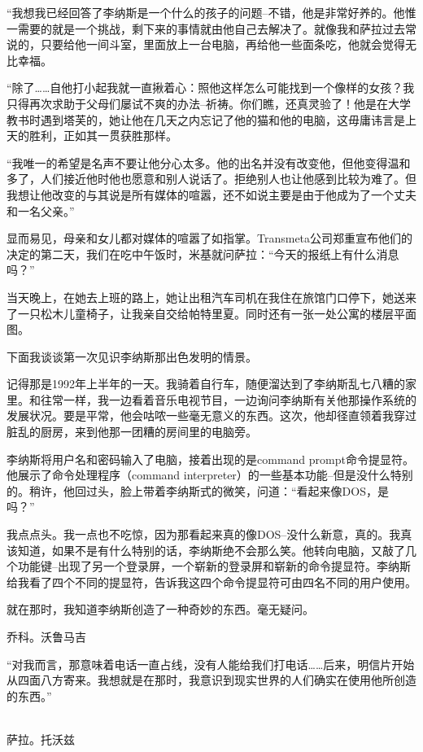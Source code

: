 “我想我已经回答了李纳斯是一个什么的孩子的问题--不错，他是非常好养的。他惟一需要的就是一个挑战，剩下来的事情就由他自己去解决了。就像我和萨拉过去常说的，只要给他一间斗室，里面放上一台电脑，再给他一些面条吃，他就会觉得无比幸福。

“除了……自他打小起我就一直揪着心：照他这样怎么可能找到一个像样的女孩？我只得再次求助于父母们屡试不爽的办法--祈祷。你们瞧，还真灵验了！他是在大学教书时遇到塔芙的，她让他在几天之内忘记了他的猫和他的电脑，这毋庸讳言是上天的胜利，正如其一贯获胜那样。

“我唯一的希望是名声不要让他分心太多。他的出名并没有改变他，但他变得温和多了，人们接近他时他也愿意和别人说话了。拒绝别人也让他感到比较为难了。但我想让他改变的与其说是所有媒体的喧嚣，还不如说主要是由于他成为了一个丈夫和一名父亲。”

显而易见，母亲和女儿都对媒体的喧嚣了如指掌。Transmeta公司郑重宣布他们的决定的第二天，我们在吃中午饭时，米基就问萨拉：“今天的报纸上有什么消息吗？”

当天晚上，在她去上班的路上，她让出租汽车司机在我住在旅馆门口停下，她送来了一只松木儿童椅子，让我亲自交给帕特里夏。同时还有一张一处公寓的楼层平面图。

 

下面我谈谈第一次见识李纳斯那出色发明的情景。

记得那是1992年上半年的一天。我骑着自行车，随便溜达到了李纳斯乱七八糟的家里。和往常一样，我一边看着音乐电视节目，一边询问李纳斯有关他那操作系统的发展状况。要是平常，他会咕哝一些毫无意义的东西。这次，他却径直领着我穿过脏乱的厨房，来到他那一团糟的房间里的电脑旁。

李纳斯将用户名和密码输入了电脑，接着出现的是command prompt命令提显符。他展示了命令处理程序（command interpreter）的一些基本功能--但是没什么特别的。稍许，他回过头，脸上带着李纳斯式的微笑，问道：“看起来像DOS，是吗？”

我点点头。我一点也不吃惊，因为那看起来真的像DOS--没什么新意，真的。我真该知道，如果不是有什么特别的话，李纳斯绝不会那么笑。他转向电脑，又敲了几个功能键--出现了另一个登录屏，一个崭新的登录屏和崭新的命令提显符。李纳斯给我看了四个不同的提显符，告诉我这四个命令提显符可由四名不同的用户使用。

就在那时，我知道李纳斯创造了一种奇妙的东西。毫无疑问。

乔科。沃鲁马吉

 

“对我而言，那意味着电话一直占线，没有人能给我们打电话……后来，明信片开始从四面八方寄来。我想就是在那时，我意识到现实世界的人们确实在使用他所创造的东西。”

　　　　　　　　　　　　　　　　　　　　　　　　　　　　　　　　　　　　　萨拉。托沃兹

